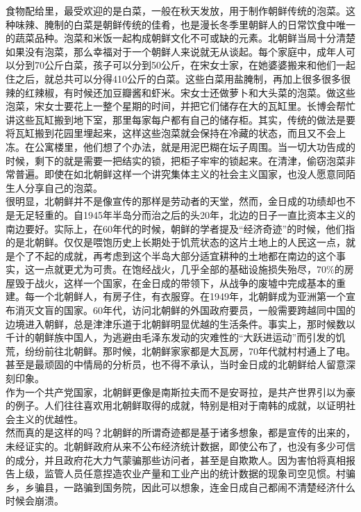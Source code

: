 食物配给里，最受欢迎的是白菜，一般在秋天发放，用于制作朝鲜传统的泡菜。这种味辣、腌制的白菜是朝鲜传统的佳肴，也是漫长冬季里朝鲜人的日常饮食中唯一的蔬菜品种。泡菜和米饭一起构成朝鲜文化不可或缺的元素。北朝鲜当局十分清楚如果没有泡菜，那么幸福对于一个朝鲜人来说就无从谈起。每个家庭中，成年人可以分到70公斤白菜，孩子可以分到50公斤，在宋女士家，在她婆婆搬来和他们一起住之后，就总共可以分得410公斤的白菜。这些白菜用盐腌制，再加上很多很多很辣的红辣椒，有时候还加豆瓣酱和虾米。宋女士还做萝卜和大头菜的泡菜。做这些泡菜，宋女士要花上一整个星期的时间，并把它们储存在大的瓦缸里。长博会帮忙讲这些瓦缸搬到地下室，那里每家每户都有自己的储存柜。其实，传统的做法是要将瓦缸搬到花园里埋起来，这样这些泡菜就会保持在冷藏的状态，而且又不会上冻。在公寓楼里，他们想了个办法，就是用泥巴糊在坛子周围。当一切大功告成的时候，剩下的就是需要一把结实的锁，把柜子牢牢的锁起来。在清津，偷窃泡菜非常普遍。即使在如北朝鲜这样一个讲究集体主义的社会主义国家，也没人愿意同陌生人分享自己的泡菜。\\

很明显，北朝鲜并不是像宣传的那样是劳动者的天堂，然而，金日成的功绩却也不是无足轻重的。自1945年半岛分而治之后的头20年，北边的日子一直比资本主义的南边要好。实际上，在60年代的时候，朝鲜的学者提及“经济奇迹”的时候，他们指的是北朝鲜。仅仅是喂饱历史上长期处于饥荒状态的这片土地上的人民这一点，就是个了不起的成就，再考虑到这个半岛大部分适宜耕种的土地都在南边的这个事实，这一点就更尤为可贵。在饱经战火，几乎全部的基础设施损失殆尽，70\%的房屋毁于战火，这样一个国家，在金日成的带领下，从战争的废墟中完成基本的重建。每一个北朝鲜人，有房子住，有衣服穿。在1949年，北朝鲜成为亚洲第一个宣布消灭文盲的国家。60年代，访问北朝鲜的外国政府要员，一般需要跨越同中国的边境进入朝鲜，总是津津乐道于北朝鲜明显优越的生活条件。事实上，那时候数以千计的朝鲜族中国人，为逃避由毛泽东发动的灾难性的“大跃进运动”而引发的饥荒，纷纷前往北朝鲜。那时候，北朝鲜家家都是大瓦房，70年代就村村通上了电。甚至是最顽固的中情局的分析员，也不得不承认，当时金日成的北朝鲜给人留意深刻印象。\\

作为一个共产党国家，北朝鲜更像是南斯拉夫而不是安哥拉，是共产世界引以为豪的例子。人们往往喜欢用北朝鲜取得的成就，特别是相对于南韩的成就，以证明社会主义的优越性。\\

然而真的是这样的吗？北朝鲜的所谓奇迹都是基于诸多想象，都是宣传的出来的，未经证实的。北朝鲜政府从来不公布经济统计数据，即使公布了，也没有多少可信的成分，并且政府花大力气蒙骗那些访问者，甚至是自欺欺人。因为害怕将真相报告上级，监管人员任意捏造农业产量和工业产出的统计数据的现象司空见惯。村骗乡，乡骗县，一路骗到国务院，因此可以想象，连金日成自己都闹不清楚经济什么时候会崩溃。\\

